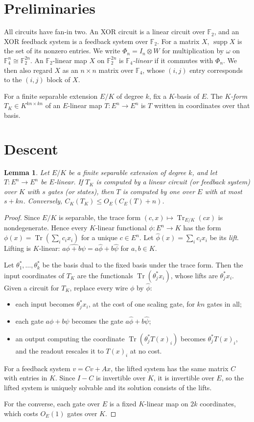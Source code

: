 \documentclass[11pt]{article}
\newtheorem{lemma}[theorem]{Lemma}
\theoremstyle{definition}
\theoremstyle{remark}
\newcommand{\F}{\mathbb{F}}
\newcommand{\Tr}{\operatorname{Tr}}
\newcommand{\supp}{\operatorname{supp}}
\begin{document}
\section{Preliminaries}
All circuits have fan-in two. An XOR circuit is a linear circuit over
$\F_2$, and an XOR feedback system is a feedback system over $\F_2$. For a
matrix $X$, $\supp X$ is the set of its nonzero entries. We write
$\Phi_n=I_n\otimes W$ for multiplication by $\omega$ on
$\F_4^n\cong\F_2^{2n}$. An $\F_2$-linear map $X$ on $\F_2^{2n}$ is
\emph{$\F_4$-linear} if it commutes with $\Phi_n$. We then also regard
$X$ as an $n\times n$ matrix over $\F_4$, whose $(i,j)$ entry corresponds
to the $(i,j)$ block of $X$.

For a finite separable extension $E/K$ of degree $k$, fix a $K$-basis of
$E$. The \emph{$K$-form} $T_K\in K^{kn\times kn}$ of an $E$-linear map
$T:E^n\to E^n$ is $T$ written in coordinates over that basis.

\section{Descent}
\begin{lemma}\label{lem:descent}
Let $E/K$ be a finite separable extension of degree $k$, and let
$T:E^n\to E^n$ be $E$-linear. If $T_K$ is computed by a linear circuit (or
feedback system) over $K$ with $s$ gates (or states), then $T$ is computed
by one over $E$ with at most $s+kn$. Conversely,
$C_K(T_K)\le O_E(C_E(T)+n)$.
\end{lemma}

\begin{proof}
Since $E/K$ is separable, the trace form $(c,x)\mapsto\Tr_{E/K}(cx)$ is
nondegenerate. Hence every $K$-linear functional $\phi:E^n\to K$ has the
form $\phi(x)=\Tr(\sum_ic_ix_i)$ for a unique $c\in E^n$. Let
$\hat\phi(x)=\sum_ic_ix_i$ be its \emph{lift}. Lifting is $K$-linear:
$\widehat{a\phi+b\psi}=a\hat\phi+b\hat\psi$ for $a,b\in K$.

Let $\theta_1^*,\dots,\theta_k^*$ be the basis dual to the fixed basis
under the trace form. Then the input coordinates of $T_K$ are the
functionals $\Tr(\theta_j^*x_i)$, whose lifts are $\theta_j^*x_i$. Given a
circuit for $T_K$, replace every wire $\phi$ by $\hat\phi$:
\begin{itemize}
\item each input becomes $\theta_j^*x_i$, at the cost of one scaling gate,
for $kn$ gates in all;
\item each gate $a\phi+b\psi$ becomes the gate $a\hat\phi+b\hat\psi$;
\item an output computing the coordinate $\Tr(\theta_j^*T(x)_i)$ becomes
$\theta_j^*T(x)_i$, and the readout rescales it to $T(x)_i$ at no cost.
\end{itemize}
For a feedback system $v=Cv+Ax$, the lifted system has the same matrix
$C$ with entries in $K$. Since $I-C$ is invertible over $K$, it is
invertible over $E$, so the lifted system is uniquely solvable and its
solution consists of the lifts.

For the converse, each gate over $E$ is a fixed $K$-linear map on $2k$
coordinates, which costs $O_E(1)$ gates over $K$.
\end{proof}
\end{document}
